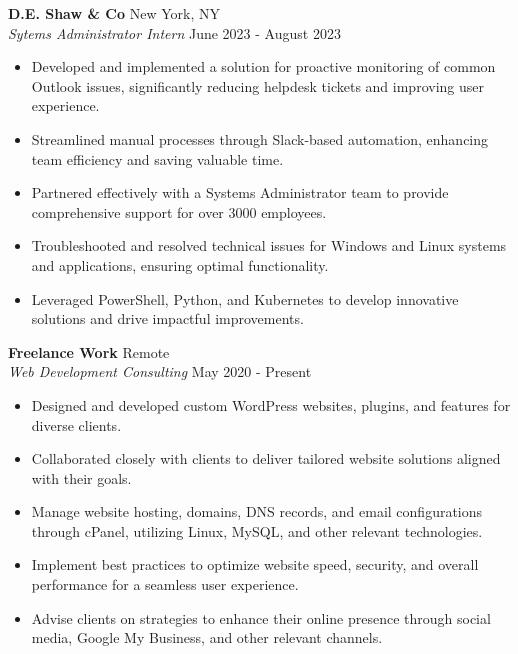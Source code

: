 \documentclass[letterpaper]{article}
\begin{document}
\vspace{-1mm}
\textbf{D.E. Shaw \& Co} \hfill New York, NY\\
\textit{Sytems Administrator Intern} \hfill June 2023 - August 2023\\
\vspace{-1mm}
\begin{itemize} \itemsep -1pt
	\item Developed and implemented a solution for proactive monitoring of common Outlook issues, significantly reducing helpdesk tickets and improving user experience.
	\item Streamlined manual processes through Slack-based automation, enhancing team efficiency and saving valuable time.
	\item Partnered effectively with a Systems Administrator team to provide comprehensive support for over 3000 employees.
	\item Troubleshooted and resolved technical issues for Windows and Linux systems and applications, ensuring optimal functionality.
	\item Leveraged PowerShell, Python, and Kubernetes to develop innovative solutions and drive impactful improvements.
\end{itemize}
\vspace{-1mm}
\textbf{Freelance Work} \hfill Remote \\
\textit{Web Development Consulting} \hfill May 2020 - Present\\
\vspace{-1mm}
\begin{itemize} \itemsep -1pt
	\item Designed and developed custom WordPress websites, plugins, and features for diverse clients.
	\item Collaborated closely with clients to deliver tailored website solutions aligned with their goals.
	\item Manage website hosting, domains, DNS records, and email configurations through cPanel, utilizing Linux, MySQL, and other relevant technologies.
	\item Implement best practices to optimize website speed, security, and overall performance for a seamless user experience.
	\item Advise clients on strategies to enhance their online presence through social media, Google My Business, and other relevant channels.
\end{itemize}
\end{document}
